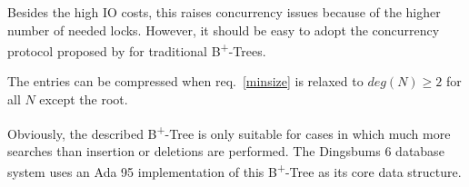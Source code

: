 \documentclass{vldb}
\begin{document}
Besides the high IO costs, this raises concurrency issues because of the higher
number of needed locks.
However, it should be easy to adopt the concurrency protocol proposed by
\cite{Lehman} for traditional B\textsuperscript{+}-Trees.

The entries can be compressed when req.~\ref{minsize} is relaxed to
\mbox{$deg(N) \geq 2$} for all $N$ except the root.

Obviously, the described B\textsuperscript{+}-Tree is only suitable for cases in
which much more searches than insertion or deletions are performed.
The Dingsbums 6 database system uses an Ada 95 implementation of this
B\textsuperscript{+}-Tree as its core data structure.




\end{document}
